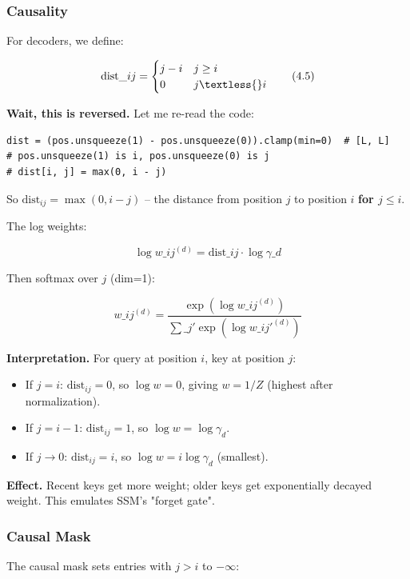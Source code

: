 \subsubsection{Causality}

For decoders, we define:

\[
\text{dist}\_{ij} = \begin{cases} j - i & j \geq i \\ 0 & j \textless{} i \end{cases}
\tag{4.5}
\]

\textbf{Wait, this is reversed.} Let me re-read the code:

\begin{lstlisting}
dist = (pos.unsqueeze(1) - pos.unsqueeze(0)).clamp(min=0)  # [L, L]
# pos.unsqueeze(1) is i, pos.unsqueeze(0) is j
# dist[i, j] = max(0, i - j)
\end{lstlisting}

So $\text{dist}_{ij} = \max(0, i - j)$ -- the distance from position $j$ to 
position $i$ \textbf{for $j \leq i$}.

The log weights:

\[
\log w\_{ij}^{(d)} = \text{dist}\_{ij} \cdot \log \gamma\_d
\tag{4.6}
\]

Then softmax over $j$ (dim=1):

\[
w\_{ij}^{(d)} = \frac{\exp(\log w\_{ij}^{(d)})}{\sum\_{j'} \exp(\log w\_{ij'}^{(d)})}
\tag{4.7}
\]

\textbf{Interpretation.} For query at position $i$, key at position $j$:

\begin{itemize}
\item If $j = i$: $\text{dist}_{ij} = 0$, so $\log w = 0$, giving $w = 1/Z$
  (highest after normalization).
\item If $j = i - 1$: $\text{dist}_{ij} = 1$, so $\log w = \log \gamma_d$.
\item If $j \to 0$: $\text{dist}_{ij} = i$, so $\log w = i \log \gamma_d$
  (smallest).

\end{itemize}
\textbf{Effect.} Recent keys get more weight; older keys get exponentially 
decayed weight. This emulates SSM's "forget gate".

\subsubsection{Causal Mask}

The causal mask sets entries with $j > i$ to $-\infty$:

